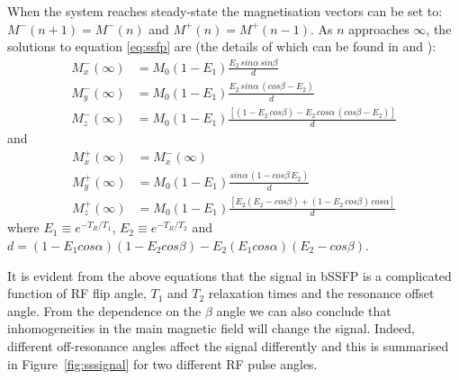 \hfill

When the system reaches steady-state the magnetisation vectors can be set to: $M^-(n+1) = M^-(n)$ and $M^+(n) = M^+(n-1)$. 
As $n$ approaches $\infty$, the solutions to equation \ref{eq:ssfp} are (the details of which can be found in \cite{Haacke1999} and \cite{Dharmakumar2005}):
\begin{equation}
    \begin{split}
        M_x^- (\infty) &= M_0 (1-E_1) \frac{E_2 \, sin \alpha  \, sin \beta}{d} \\
        M_y^- (\infty) &= M_0 (1-E_1) \frac{E_2  \, sin \alpha \,  (cos \beta - E_2)}{d} \\
        M_z^- (\infty) &= M_0 (1-E_1) \frac{[(1 - E_2  \, cos \beta) - E_2  \, cos \alpha  \, (cos \beta - E_2)]}{d} 
    \end{split}
\end{equation}
and
\begin{equation}
    \begin{split}
        M_x^+ (\infty) &= M_x^- (\infty) \\
        M_y^+ (\infty) &= M_0 (1-E_1) \frac{sin \alpha  \, (1 - cos \beta  \, E_2)}{d} \\
        M_z^+ (\infty) &= M_0 (1-E_1) \frac{[E_2 (E_2 - cos\beta) + (1-E_2  \, cos\beta)  \, cos \alpha]}{d} 
    \end{split}
\end{equation}
where $E_1 \equiv e^{-T_R/T_1}$, $E_2 \equiv e^{-T_R/T_2}$ and 
$d = (1-E_1 cos \alpha) (1 - E_2 cos\beta) - E_2 (E_1 cos\alpha) (E_2 - cos \beta)$.

\hfill

It is evident from the above equations that the signal in bSSFP is a complicated function of RF flip angle, $T_1$ and $T_2$ relaxation times and the resonance offset angle.
From the dependence on the $\beta$ angle we can also conclude that inhomogeneities in the main magnetic field will change the signal.
Indeed, different off-resonance angles affect the signal differently and this is summarised in Figure~\ref{fig:sssignal} for two different RF pulse angles.

